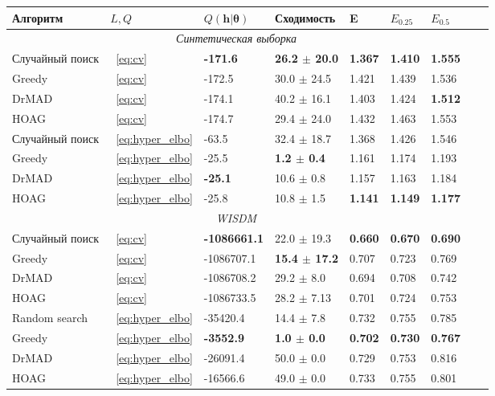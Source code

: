 \begin{table}
\small
\begin{tabularx}{\textwidth}{ |X|X|X|X|X|X|X|X|X|}

\hline
\textbf{Алгоритм} & $L, Q$  & $Q(\mathbf{h}| \boldsymbol{\theta} )$ & Сходимость & E & $E_{0.25}$ & $E_{0.5}$\\ 
\hline
\multicolumn{7}{|c|}{\textit{Синтетическая выборка}}  \\
\hline
Случайный поиск & ~\eqref{eq:cv} & \bf -171.6  &\bf 26.2 $\pm$ 20.0  & \bf 1.367 &\bf 1.410 &\bf 1.555 \\
\hline
Greedy & ~\eqref{eq:cv} & -172.5 & 30.0 $\pm$ 24.5 & 1.421 & 1.439 &  1.536\\
\hline
DrMAD & ~\eqref{eq:cv} & -174.1 & 40.2 $\pm$ 16.1 &  1.403 & 1.424 & \bf 1.512 \\
\hline
HOAG & ~\eqref{eq:cv} &-174.7 & 29.4 $\pm$ 24.0 &    1.432  & 1.463 & 1.553\\
\hline
Случайный поиск & ~\eqref{eq:hyper_elbo} & -63.5  & 32.4 $\pm$ 18.7  & 1.368 & 1.426 & 1.546  \\
\hline
Greedy & ~\eqref{eq:hyper_elbo} & -25.5 & \bf 1.2 $\pm$ 0.4 & 1.161 & 1.174 & 1.193\\
\hline
DrMAD & ~\eqref{eq:hyper_elbo} & \bf -25.1 &  10.6 $\pm$ 0.8 &  1.157 & 1.163 &  1.184\\
\hline
HOAG & ~\eqref{eq:hyper_elbo} &-25.8 & 10.8 $\pm$ 1.5&   \bf 1.141  & \bf 1.149 & \bf 1.177\\
\hline


\multicolumn{7}{|c|}{\textit{WISDM}}  \\
\hline
Случайный поиск & ~\eqref{eq:cv} & \bf -1086661.1  & 22.0 $\pm$ 19.3  & \bf 0.660 & \bf 0.670 & \bf 0.690  \\
\hline
Greedy & ~\eqref{eq:cv} & -1086707.1 & \bf 15.4 $\pm$ 17.2 & 0.707 &  0.723  &  0.769\\
\hline
DrMAD & ~\eqref{eq:cv} & -1086708.2 & 29.2 $\pm$ 8.0 &  0.694 &  0.708 & 0.742 \\
\hline
HOAG & ~\eqref{eq:cv} & -1086733.5 & 28.2 $\pm$ 7.13&   0.701 & 0.724 & 0.753 \\
\hline
Random search & ~\eqref{eq:hyper_elbo} & -35420.4 &   14.4 $\pm$ 7.8  &   0.732 &   0.755 & 0.785 \\
\hline
Greedy & ~\eqref{eq:hyper_elbo} & \bf -3552.9 &\bf 1.0 $\pm$ 0.0  &   \bf 0.702 & \bf 0.730  &  \bf 0.767\\
\hline
DrMAD & ~\eqref{eq:hyper_elbo} & -26091.4 &   50.0 $\pm$ 0.0  & 0.729 &  0.753 & 0.816 \\
\hline
HOAG & ~\eqref{eq:hyper_elbo} &  -16566.6 & 49.0 $\pm$ 0.0  &  0.733 &  0.755 &  0.801 \\
\hline




\end{tabularx}
\end{table}
